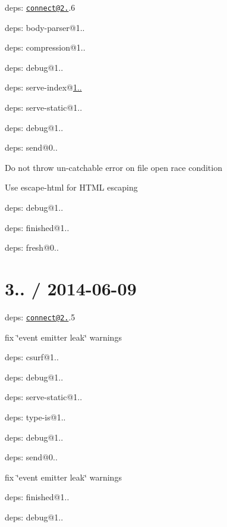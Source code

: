 \begin{DoxyItemize}
\item deps\+: \href{mailto:connect@2.19}{\tt connect@2.}.6
\begin{DoxyItemize}
\item deps\+: body-\/parser@1..
\item deps\+: compression@1..
\item deps\+: debug@1..
\item deps\+: serve-\/index@\hyperlink{namespace1_1_11_1_11}{1..}
\item deps\+: serve-\/static@1..
\end{DoxyItemize}
\item deps\+: debug@1..
\item deps\+: send@0..
\begin{DoxyItemize}
\item Do not throw un-\/catchable error on file open race condition
\item Use {\ttfamily escape-\/html} for H\+T\+M\+L escaping
\item deps\+: debug@1..
\item deps\+: finished@1..
\item deps\+: fresh@0..
\end{DoxyItemize}
\end{DoxyItemize}

\section*{3.. / 2014-\/06-\/09 }


\begin{DoxyItemize}
\item deps\+: \href{mailto:connect@2.19}{\tt connect@2.}.5
\begin{DoxyItemize}
\item fix \char`\"{}event emitter leak\char`\"{} warnings
\item deps\+: csurf@1..
\item deps\+: debug@1..
\item deps\+: serve-\/static@1..
\item deps\+: type-\/is@1..
\end{DoxyItemize}
\item deps\+: debug@1..
\item deps\+: send@0..
\begin{DoxyItemize}
\item fix \char`\"{}event emitter leak\char`\"{} warnings
\item deps\+: finished@1..
\item deps\+: debug@1..
\end{DoxyItemize}
\end{DoxyItemize}

